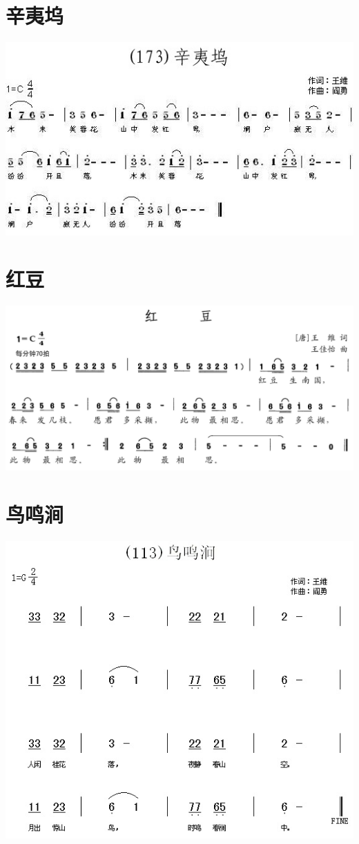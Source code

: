 \documentclass[cn,pad,twocol]{elegantbook}
\begin{document}
\section{辛夷坞}
    \includegraphics[width=\textwidth]{dongxiao/20200627-王维-辛夷坞.jpg} 
\section{红豆}
    \includegraphics[width=\textwidth]{dongxiao/20200628-王维-红豆} 
\section{鸟鸣涧}
    \includegraphics[width=\textwidth]{dongxiao/20200627-王维-鸟鸣涧}
\end{document}
